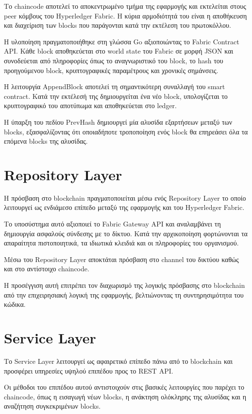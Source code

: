 \documentclass[12pt,a4paper]{report}
\begin{document}
Το chaincode αποτελεί το αποκεντρωμένο τμήμα της εφαρμογής και
εκτελείται στους peer κόμβους του Hyperledger Fabric. Η κύρια
αρμοδιότητά του είναι η αποθήκευση και διαχείριση των blocks που
παράγονται κατά την εκτέλεση του πρωτοκόλλου.

Η υλοποίηση πραγματοποιήθηκε στη γλώσσα Go αξιοποιώντας το
Fabric Contract API. Κάθε block αποθηκεύεται στο world state
του Fabric σε μορφή JSON και συνοδεύεται από πληροφορίες όπως
το αναγνωριστικό του block, το hash του προηγούμενου block,
κρυπτογραφικές παραμέτρους και χρονικές σημάνσεις.

Η λειτουργία AppendBlock αποτελεί τη σημαντικότερη συναλλαγή
του smart contract. Κατά την εκτέλεσή της δημιουργείται ένα
νέο block, υπολογίζεται το κρυπτογραφικό του αποτύπωμα και
αποθηκεύεται στο ledger.

Η ύπαρξη του πεδίου PrevHash δημιουργεί μία αλυσίδα
εξαρτήσεων μεταξύ των blocks, εξασφαλίζοντας ότι οποιαδήποτε
τροποποίηση ενός block θα επηρεάσει όλα τα επόμενα blocks της
αλυσίδας.
\section{Repository Layer}

Η πρόσβαση στο blockchain πραγματοποιείται μέσω ενός
Repository Layer το οποίο λειτουργεί ως ενδιάμεσο επίπεδο
μεταξύ της εφαρμογής και του Hyperledger Fabric.

Το υποσύστημα αυτό αξιοποιεί το Fabric Gateway API και
αναλαμβάνει τη δημιουργία ασφαλούς σύνδεσης με το δίκτυο.
Κατά την αρχικοποίηση φορτώνονται τα απαραίτητα πιστοποιητικά,
τα ιδιωτικά κλειδιά και οι πληροφορίες του οργανισμού.

Μέσω του Repository Layer αποκτάται πρόσβαση στο channel
του δικτύου καθώς και στο αντίστοιχο chaincode.

Η προσέγγιση αυτή επιτρέπει τον διαχωρισμό της λογικής
πρόσβασης στο blockchain από την επιχειρησιακή λογική
της εφαρμογής, βελτιώνοντας τη συντηρησιμότητα του
κώδικα.
\section{Service Layer}

Το Service Layer λειτουργεί ως αφαιρετικό επίπεδο πάνω από
το blockchain και προσφέρει υπηρεσίες υψηλού επιπέδου προς
το REST API.

Οι μέθοδοι του επιπέδου αυτού αντιστοιχούν στις βασικές
λειτουργίες που παρέχει το chaincode, όπως η εισαγωγή
νέων blocks, η ανάκτηση ολόκληρης της αλυσίδας και η
αναζήτηση συγκεκριμένων blocks.
\end{document}
